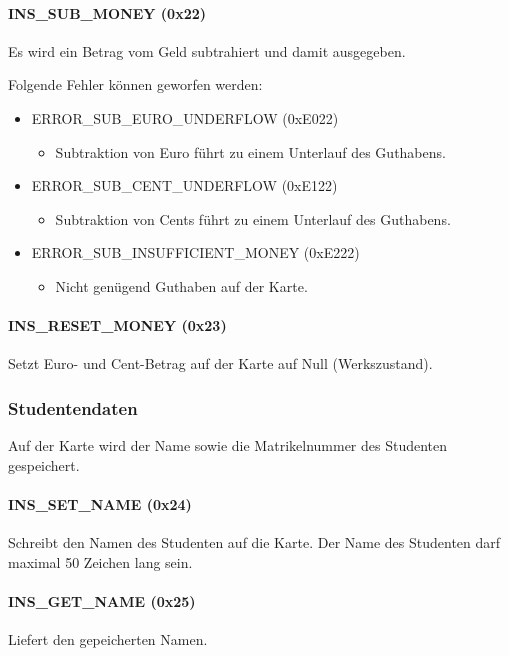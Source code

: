 \paragraph{INS\_SUB\_MONEY (0x22)}
Es wird ein Betrag vom Geld subtrahiert und damit ausgegeben.

Folgende Fehler können geworfen werden:
 \begin{itemize}
 	\item ERROR\_SUB\_EURO\_UNDERFLOW (0xE022)
 	\begin{itemize}
 		\item Subtraktion von Euro führt zu einem Unterlauf des Guthabens.
 	\end{itemize}
 	 \item ERROR\_SUB\_CENT\_UNDERFLOW (0xE122)
 	\begin{itemize}
 		\item Subtraktion von Cents führt zu einem Unterlauf des Guthabens.
 	\end{itemize}
 	 \item ERROR\_SUB\_INSUFFICIENT\_MONEY (0xE222)
 	\begin{itemize}
 		\item Nicht genügend Guthaben auf der Karte.
 	\end{itemize}
 \end{itemize}
 
\paragraph{INS\_RESET\_MONEY (0x23)}
Setzt Euro- und Cent-Betrag auf der Karte auf Null (Werkszustand).

\subsubsection{Studentendaten}
Auf der Karte wird der Name sowie die Matrikelnummer des Studenten gespeichert.

\paragraph{INS\_SET\_NAME (0x24)}
Schreibt den Namen des Studenten auf die Karte.
Der Name des Studenten darf maximal 50 Zeichen lang sein.

\paragraph{INS\_GET\_NAME (0x25)}
Liefert den gepeicherten Namen.

